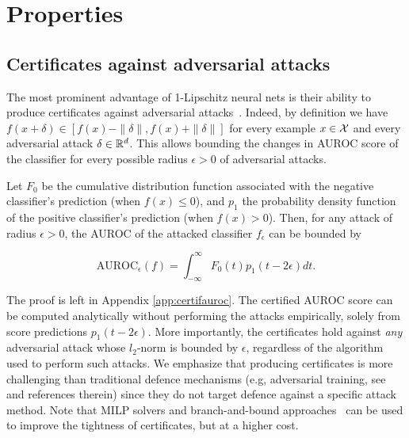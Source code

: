 \section{Properties}

\subsection{Certificates against adversarial attacks}  

The most prominent advantage of 1-Lipschitz neural nets is their ability to produce certificates against adversarial attacks~\cite{szegedy2013}. Indeed, by definition we have $f(x+\delta)\in[f(x)-\|\delta\|, f(x)+\|\delta\|]$ for every example $x\in\mathcal{X}$ and every adversarial attack $\delta\in\mathbb{R}^d$. This allows bounding the changes in AUROC score of the classifier for every possible radius $\epsilon>0$ of adversarial attacks.  
  

\begin{proposition}\label{certifauroc}
 Let $F_0$ be the cumulative distribution function associated with the negative classifier's prediction (when $f(x) \leq 0$), and $p_1$ the probability density function of the positive classifier's prediction (when $f(x) > 0$). Then, for any attack of radius $\epsilon > 0$, the AUROC of the attacked classifier $f_{\epsilon}$ can be bounded by
 
\begin{equation}
    \text{AUROC}_{\epsilon}(f) = \int_{-\infty}^{\infty} F_0(t)p_1(t-2\epsilon)dt.
\end{equation}
\end{proposition}
 

The proof is left in Appendix \ref{app:certifauroc}. The certified AUROC score can be computed analytically without performing the attacks empirically, solely from score predictions $p_1(t-2\epsilon)$. More importantly, the certificates hold against \textit{any} adversarial attack whose $l_2$-norm is bounded by $\epsilon$, regardless of the algorithm used to perform such attacks. We emphasize that producing certificates is more challenging than traditional defence mechanisms (e.g, adversarial training, see~\cite{ijcai2021p591} and references therein) since they do not target defence against a specific attack method. Note that MILP solvers and branch-and-bound {approaches~\cite{tjengevaluating2019,wang2021beta}} can be used to improve the tightness of certificates, but at a higher cost.  




